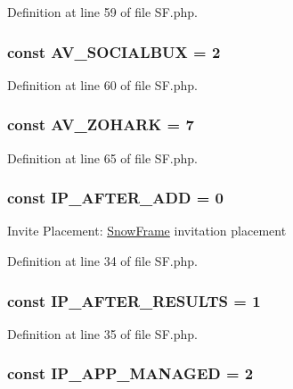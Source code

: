 Definition at line 59 of file SF.php.

\hypertarget{classSF_af000b8454bbc1a09a408a72f35051d24}{
\subsubsection[{AV\_\-SOCIALBUX}]{\setlength{\rightskip}{0pt plus 5cm}const {\bf AV\_\-SOCIALBUX} = 2}}
\label{classSF_af000b8454bbc1a09a408a72f35051d24}


Definition at line 60 of file SF.php.

\hypertarget{classSF_a10f5636e483476988e38b9872633bc2b}{
\subsubsection[{AV\_\-ZOHARK}]{\setlength{\rightskip}{0pt plus 5cm}const {\bf AV\_\-ZOHARK} = 7}}
\label{classSF_a10f5636e483476988e38b9872633bc2b}


Definition at line 65 of file SF.php.

\hypertarget{classSF_a784e119a8dc4eba2b5560832e8b737f0}{
\subsubsection[{IP\_\-AFTER\_\-ADD}]{\setlength{\rightskip}{0pt plus 5cm}const {\bf IP\_\-AFTER\_\-ADD} = 0}}
\label{classSF_a784e119a8dc4eba2b5560832e8b737f0}
Invite Placement: \hyperlink{classSnowFrame}{SnowFrame} invitation placement 

Definition at line 34 of file SF.php.

\hypertarget{classSF_a2071040416c247d57cda2ea628331c72}{
\subsubsection[{IP\_\-AFTER\_\-RESULTS}]{\setlength{\rightskip}{0pt plus 5cm}const {\bf IP\_\-AFTER\_\-RESULTS} = 1}}
\label{classSF_a2071040416c247d57cda2ea628331c72}


Definition at line 35 of file SF.php.

\hypertarget{classSF_a22eebe42ba8477df8d917b9b7a88d33f}{
\subsubsection[{IP\_\-APP\_\-MANAGED}]{\setlength{\rightskip}{0pt plus 5cm}const {\bf IP\_\-APP\_\-MANAGED} = 2}}
\label{classSF_a22eebe42ba8477df8d917b9b7a88d33f}


